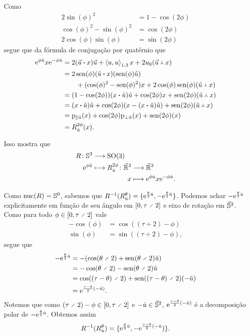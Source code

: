 Como
	\begin{align*}
	2\sin(\phi)^2 &= 1-\cos(2\phi) \\
	\cos(\phi)^2 - \sin(\phi)^2 &= \cos(2\phi) \\
	2\cos(\phi)\sin(\phi) &= \sin(2\phi)
	\end{align*}
segue que da fórmula de conjugação por quatérnio que
	\begin{align*}
	\e^{\phi \hat{u}}x\e^{-\phi \hat{u}} &= 2(\pesc{\vec{u}}{x})\vec{u} + \inteq{u}{u}x + 2\esc{u}(\pvec{\vec{u}}{x}) \\
		&= 2\sin(\phi)(\pesc{\hat{u}}{x})(\sin(\phi)\hat{u}) \\
		&\qquad+ (\cos(\phi)^2-\sin(\phi)^2)x + 2\cos(\phi)\sin(\phi)(\pvec{\hat{u}}{x}) \\
		&= (1-\cos(2\phi))(\pesc{x}{\hat{u}})\hat{u} + \cos(2\phi)x + \sin(2\phi)(\pvec{\hat{u}}{x}) \\
		&= (\pesc{x}{\hat{u}})\hat{u} + \cos(2\phi)(x-(\pesc{x}{\hat{u}})\hat{u}) + \sin(2\phi)(\pvec{\hat{u}}{x}) \\
		&= \proj_{\parallel \hat{u}}(x) + \cos(2\phi)\proj_{\perp \hat{u}}(x) + \sin(2\phi)(x) \\
		&= R^{2\phi}_{\hat{u}}(x).
	\end{align*}

Isso mostra que
	\begin{align*}
	\func{R}{\S^3}{\SO(3)}{\e^{\phi \hat{u}}}{
		\begin{aligned}[t]
		\func{R^{2\phi}_{\hat{u}}}{\vec{\R}^3}{\vec{\R}^3}{x}{\e^{\phi \hat{u}}x\e^{-\phi \hat{u}}}.
		\end{aligned}
	}
	\end{align*}

Como $\nuc(R) = \S^0$, sabemos que $R\inv(R^{\theta}_{\hat{u}}) = \{\e^{\frac{\theta}{2}\hat{u}},-\e^{\frac{\theta}{2}\hat{u}}\}$. Podemos achar $-\e^{\frac{\theta}{2}\hat{u}}$ explicitamente em função de seu ângulo em $\intff{0}{\tau \div 2}$ e eixo de rotação em $\vec{\S}^2$. Como para todo $\phi \in \intff{0}{\tau \div 2}$ vale
	\begin{align*}
	-\cos(\phi) &= \cos((\tau \div 2) - \phi) \\
	\sin(\phi) &= \sin((\tau \div 2) - \phi),
	\end{align*}
segue que
	\begin{align*}
	-\e^{\frac{\theta}{2}\hat{u}} &= -(\cos(\theta \div 2) + \sin(\theta \div 2) \hat{u}) \\
		&= -\cos(\theta \div 2) - \sin(\theta \div 2) \hat{u} \\
		&= \cos((\tau-\theta) \div 2) + \sin((\tau - \theta) \div 2)(-\hat{u}) \\
		&= \e^{\frac{\tau - \theta}{2}(-\hat{u})}.
	\end{align*}
Notemos que como $(\tau \div 2) - \phi \in \intff{0}{\tau \div 2}$ e $-\hat{u} \in \vec{\S}^2$, $\e^{\frac{\tau - \theta}{2}(-\hat{u})}$ é a decomposição polar de $-\e^{\frac{\theta}{2}\hat{u}}$. Obtemos assim
	\begin{equation*}
	R\inv(R^{\theta}_{\hat{u}}) = \{\e^{\frac{\theta}{2}\hat{u}},-\e^{\frac{\tau - \theta}{2}(-\hat{u}})\}.
	\end{equation*}


